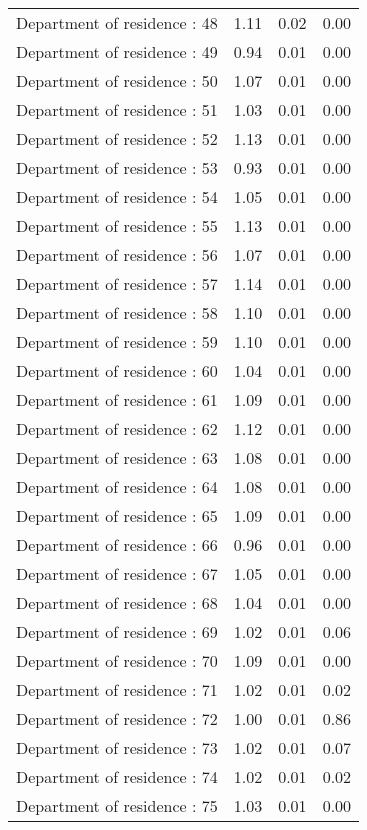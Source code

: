 \documentclass{article}
\begin{document}
\begin{longtable}{lrrr}
Department of residence : 48 & 1.11 & 0.02 & 0.00 \\ 
Department of residence : 49 & 0.94 & 0.01 & 0.00 \\ 
Department of residence : 50 & 1.07 & 0.01 & 0.00 \\ 
Department of residence : 51 & 1.03 & 0.01 & 0.00 \\ 
Department of residence : 52 & 1.13 & 0.01 & 0.00 \\ 
Department of residence : 53 & 0.93 & 0.01 & 0.00 \\ 
Department of residence : 54 & 1.05 & 0.01 & 0.00 \\ 
Department of residence : 55 & 1.13 & 0.01 & 0.00 \\ 
Department of residence : 56 & 1.07 & 0.01 & 0.00 \\ 
Department of residence : 57 & 1.14 & 0.01 & 0.00 \\ 
Department of residence : 58 & 1.10 & 0.01 & 0.00 \\ 
Department of residence : 59 & 1.10 & 0.01 & 0.00 \\ 
Department of residence : 60 & 1.04 & 0.01 & 0.00 \\ 
Department of residence : 61 & 1.09 & 0.01 & 0.00 \\ 
Department of residence : 62 & 1.12 & 0.01 & 0.00 \\ 
Department of residence : 63 & 1.08 & 0.01 & 0.00 \\ 
Department of residence : 64 & 1.08 & 0.01 & 0.00 \\ 
Department of residence : 65 & 1.09 & 0.01 & 0.00 \\ 
Department of residence : 66 & 0.96 & 0.01 & 0.00 \\ 
Department of residence : 67 & 1.05 & 0.01 & 0.00 \\ 
Department of residence : 68 & 1.04 & 0.01 & 0.00 \\ 
Department of residence : 69 & 1.02 & 0.01 & 0.06 \\ 
Department of residence : 70 & 1.09 & 0.01 & 0.00 \\ 
Department of residence : 71 & 1.02 & 0.01 & 0.02 \\ 
Department of residence : 72 & 1.00 & 0.01 & 0.86 \\ 
Department of residence : 73 & 1.02 & 0.01 & 0.07 \\ 
Department of residence : 74 & 1.02 & 0.01 & 0.02 \\ 
Department of residence : 75 & 1.03 & 0.01 & 0.00 \\ 

\end{longtable}
\end{document}
